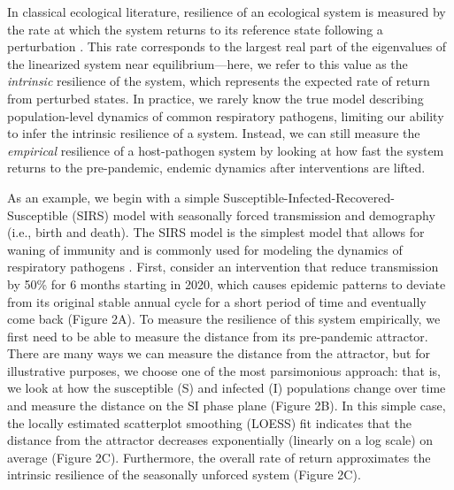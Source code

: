 \documentclass[12pt]{article}
\begin{document}
In classical ecological literature, resilience of an ecological system is measured by the rate at which the system returns to its reference state following a perturbation \citep{pimm1979structure, neubert1997alternatives,gunderson2000ecological,dakos2022ecological}.
This rate corresponds to the largest real part of the eigenvalues of the linearized system near equilibrium---here, we refer to this value as the \emph{intrinsic} resilience of the system, which represents the expected rate of return from perturbed states.
In practice, we rarely know the true model describing population-level dynamics of common respiratory pathogens, limiting our ability to infer the intrinsic resilience of a system.
Instead, we can still measure the \emph{empirical} resilience of a host-pathogen system by looking at how fast the system returns to the pre-pandemic, endemic dynamics after interventions are lifted.

As an example, we begin with a simple Susceptible-Infected-Recovered-Susceptible (SIRS) model with seasonally forced transmission and demography (i.e., birth and death).
The SIRS model is the simplest model that allows for waning of immunity and is commonly used for modeling the dynamics of respiratory pathogens \citep{dushoff2004dynamical}.
First, consider an intervention that reduce transmission by 50\% for 6 months starting in 2020, which causes epidemic patterns to deviate from its original stable annual cycle for a short period of time and eventually come back (Figure 2A).
To measure the resilience of this system empirically, we first need to be able to measure the distance from its pre-pandemic attractor.
There are many ways we can measure the distance from the attractor, but for illustrative purposes, we choose one of the most parsimonious approach: that is, we look at how the susceptible (S) and infected (I) populations change over time and measure the distance on the SI phase plane (Figure 2B).
In this simple case, the locally estimated scatterplot smoothing (LOESS) fit indicates that the distance from the attractor decreases exponentially (linearly on a log scale) on average (Figure 2C).
Furthermore, the overall rate of return approximates the intrinsic resilience of the seasonally unforced system (Figure 2C).
\end{document}
